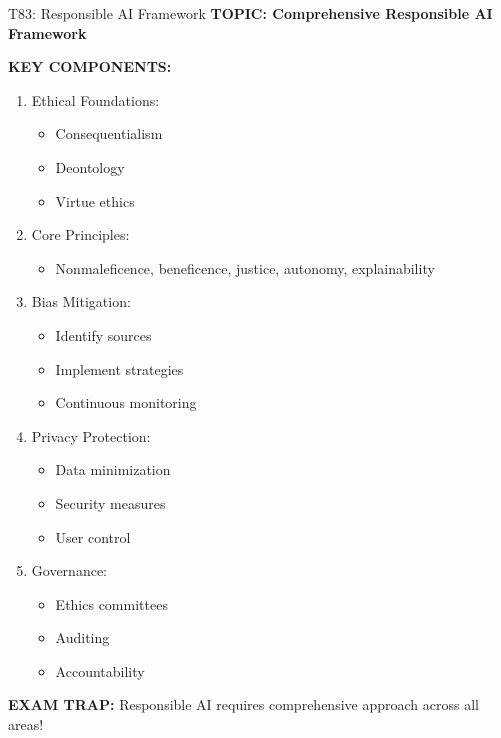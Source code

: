\documentclass[8pt]{beamer}
\begin{document}
	\begin{frame}{T83: Responsible AI Framework}
		\fontsize{6.5}{7.5}\selectfont
		\textbf{TOPIC: Comprehensive Responsible AI Framework}
		
		\vspace{0.1cm}
		\textbf{KEY COMPONENTS:}
		\begin{enumerate}
			\item \textcolor{myblue}{Ethical Foundations:}
			\begin{itemize}
				\item Consequentialism
				\item Deontology
				\item Virtue ethics
			\end{itemize}
			\item \textcolor{myblue}{Core Principles:}
			\begin{itemize}
				\item Nonmaleficence, beneficence, justice, autonomy, explainability
			\end{itemize}
			\item \textcolor{myblue}{Bias Mitigation:}
			\begin{itemize}
				\item Identify sources
				\item Implement strategies
				\item Continuous monitoring
			\end{itemize}
			\item \textcolor{myblue}{Privacy Protection:}
			\begin{itemize}
				\item Data minimization
				\item Security measures
				\item User control
			\end{itemize}
			\item \textcolor{myblue}{Governance:}
			\begin{itemize}
				\item Ethics committees
				\item Auditing
				\item Accountability
			\end{itemize}
		\end{enumerate}
		
		\textcolor{myred}{\textbf{EXAM TRAP:}} Responsible AI requires \textcolor{myblue}{comprehensive approach} across all areas!
	\end{frame}
	
\end{document}
